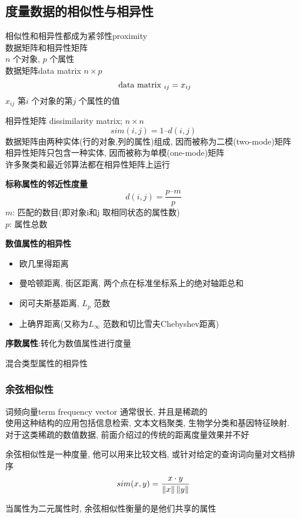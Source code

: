 \documentclass{article}
\begin{document}
\subsection{度量数据的相似性与相异性}
相似性和相异性都成为紧邻性proximity\\
数据矩阵和相异性矩阵\\
$n$ 个对象, $p$ 个属性\\
数据矩阵data matrix $n \times p$\\
$$
\text{ data matrix }_{ij} = x_{ij}
$$
$x_{ij}$ 第$i$ 个对象的第$j$ 个属性的值

相异性矩阵 dissimilarity matrix; $n \times n$
$$
sim(i,j) = 1 – d(i,j)
$$
数据矩阵由两种实体(行的对象,列的属性)组成, 因而被称为二模(two-mode)矩阵\\
相异性矩阵只包含一种实体, 因而被称为单模(one-mode)矩阵\\

许多聚类和最近邻算法都在相异性矩阵上运行

\textbf{标称属性的邻近性度量}
$$
d(i,j) = \frac{p – m}{p}
$$
$m$: 匹配的数目(即对象i和j 取相同状态的属性数)\\
$p$: 属性总数

\textbf{数值属性的相异性}\par
\begin{itemize}
\item 欧几里得距离
\item 曼哈顿距离, 街区距离, 两个点在标准坐标系上的绝对轴距总和
\item 闵可夫斯基距离, $L_p$ 范数
\item 上确界距离(又称为$L_{\infty}$ 范数和切比雪夫Chebyshev距离)
\end{itemize}

\textbf{序数属性}:转化为数值属性进行度量

混合类型属性的相异性

\subsubsection{余弦相似性}
词频向量term frequency vector 通常很长, 并且是稀疏的\\
使用这种结构的应用包括信息检索, 文本文档聚类, 生物学分类和基因特征映射.\\
对于这类稀疏的数值数据, 前面介绍过的传统的距离度量效果并不好

余弦相似性是一种度量, 他可以用来比较文档, 或针对给定的查询词向量对文档排序
$$sim(x,y) = \dfrac{x \cdot y}{\left\Vert x\right\Vert \left\Vert y\right\Vert}$$

当属性为二元属性时, 余弦相似性衡量的是他们共享的属性
\end{document}
